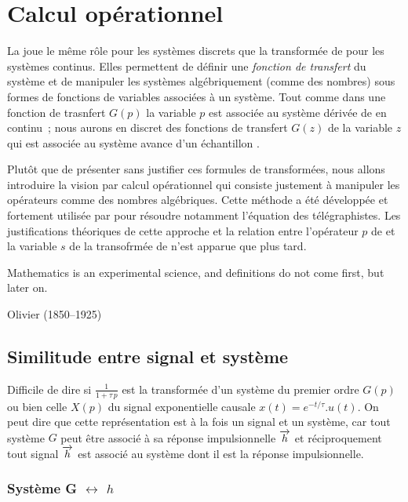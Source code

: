 \section{Calcul opérationnel}

La \teZ{} joue le même rôle pour les systèmes discrets que la
transformée de \Laplace{} pour les systèmes continus. Elles permettent
de définir une \emph{fonction de transfert} du système et de manipuler
les systèmes algébriquement (comme des nombres) sous formes de
fonctions de variables associées à un système. Tout comme dans une
fonction de trasnfert $G(p)$ la variable $p$ est associée au système
\og dérivée de \fg{} en continu~; nous aurons en discret des fonctions
de transfert $G(z)$ de la variable $z$ qui est associée au système \og
avance d'un échantillon \fg{}.

Plutôt que de présenter sans justifier ces formules de transformées,
nous allons introduire la vision par calcul opérationnel qui consiste
justement à manipuler les opérateurs comme des nombres
algébriques. Cette méthode a été développée et fortement utilisée par
\Heaviside{} pour résoudre notamment l'équation des
télégraphistes. Les justifications théoriques de cette approche et la
relation entre l'opérateur $p$ de \Heaviside{} et la variable $s$ de
la transofrmée de \Laplace{} n'est apparue que plus tard.

\begin{citations} Mathematics is an experimental science, and
  definitions do not come first, but later on.

  \hfill Olivier \Heaviside{} (1850--1925)
\end{citations}

\subsection{Similitude entre signal et système}

Difficile de dire si $\frac{1}{1+\tau\,p}$ est la transformée d'un
système du premier ordre $G(p)$ ou bien celle $X(p)$ du signal
exponentielle causale $x(t)=e^{-t/\tau}.u(t)$. On peut dire que cette
représentation est à la fois un signal et un système, car tout système
$G$ peut être associé à sa réponse impulsionnelle $\overrightarrow{h}$ et
réciproquement tout signal $\overrightarrow{h}$ est associé au système dont il
est la réponse impulsionnelle.

\subsubsection{Système G $\leftrightarrow$ \RIP{} $h$}

